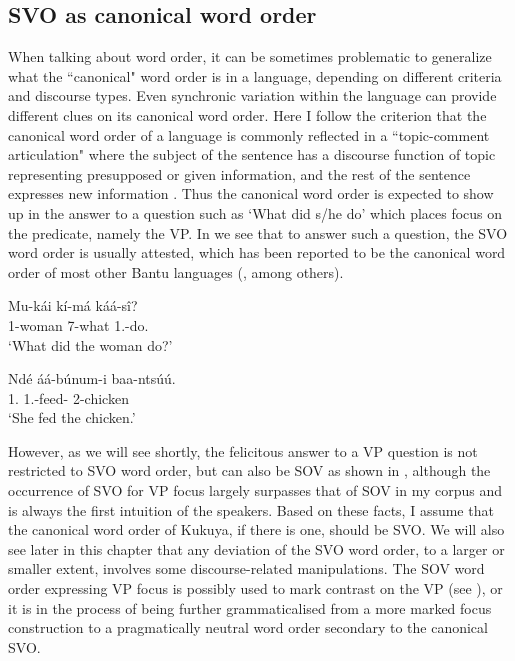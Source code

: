 \documentclass[output=paper,colorlinks,citecolor=brown,
]{langscibook}
\begin{document}
\subsection{SVO as canonical word order}\label{teke:sec:2.1}
When talking about word order, it can be sometimes problematic to generalize what the ``canonical" word order is in a language, depending on different criteria and discourse types. Even synchronic variation within the language can provide different clues on its canonical word order. Here I follow the criterion that the canonical word order of a language is commonly reflected in a ``topic-comment articulation" where the subject of the sentence has a discourse function of topic representing presupposed or given information, and the rest of the sentence expresses new information \citep{Lambrecht1994, Andrews2007}. Thus the canonical word order is expected to show up in the answer to a question such as `What did s/he do' which places focus on the predicate, namely the VP. In  we see that to answer such a question, the SVO word order is usually attested, which has been reported to be the canonical word order of most other Bantu languages (\citealt{Bearth2003, vanderWal2015, DowningMarten2019}, among others).
\begin{exe}
    \ex \label{1}
    \begin{xlist}
\ex
\label{1a}
\gll
Mu-kái kí-má káá-sî?\\
1-woman 7-what 1\Sm{}.\Pst{}-do.\Pst{}\\
\trans ‘What did the woman do?’

\ex
\label{1b}
\gll
Ndé áá-b\'{u}num-i baa-nts\'{u}\'{u}.\\
1.\Pro{} 1\Sm{}.\Pst{}-feed-\Pst{} 2-chicken\\
\trans ‘She fed the chicken.’

    \end{xlist}
\end{exe} 
However, as we will see shortly, the felicitous answer to a VP question is not restricted to SVO word order, but can also be SOV as shown in , although the occurrence of SVO for VP focus largely surpasses that of SOV in my corpus and is always the first intuition of the speakers. Based on these facts, I assume that the canonical word order of Kukuya, if there is one, should be SVO. We will also see later in this chapter that any deviation of the SVO word order, to a larger or smaller extent, involves some discourse-related manipulations. The SOV word order expressing VP focus is possibly used to mark contrast on the VP (see ), or it is in the process of being further grammaticalised from a more marked focus construction to a pragmatically neutral word order secondary to the canonical SVO. 
\end{document}
